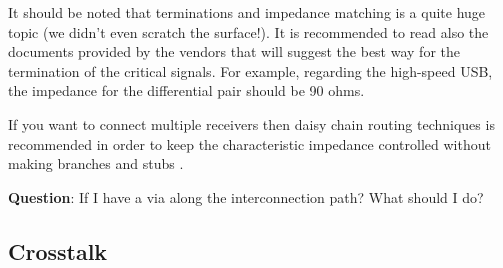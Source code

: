 \documentclass[final]{cubedoc}
\begin{document}
	It should be noted that terminations and impedance matching is a quite huge topic (we didn't even scratch the surface!). It is recommended to read also the documents provided by the vendors that will suggest the best way for the termination of the critical signals. For example, regarding the high-speed USB, the impedance for the differential pair should be 90 ohms.
	
	
	
	
	
	
	If you want to connect multiple receivers then daisy chain routing techniques is recommended in order to keep the characteristic impedance controlled without making branches and stubs \cite{bogatin2009signal}.
	
	\textbf{Question}: If I have a via along the interconnection path? What should I do?
	
	\subsection{Crosstalk}
	
	
	
	
\end{document}
